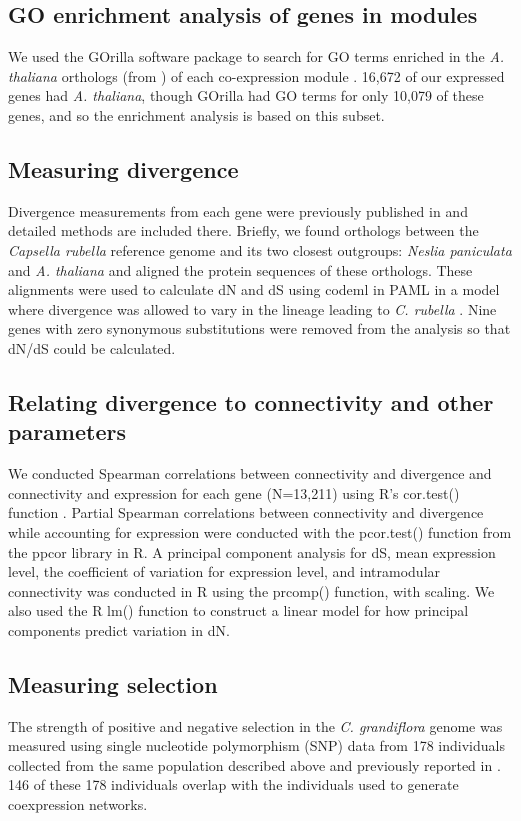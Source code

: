 \subsection{GO enrichment analysis of genes in modules}
We used the GOrilla software package to search for GO terms enriched in the \textit{A. thaliana} orthologs (from \citep{Williamson2014-tf}) of each co-expression module \citep{Eden2009-hl}. 16,672 of our expressed genes had \textit{A. thaliana}, though GOrilla had GO terms for only 10,079 of these genes, and so the enrichment analysis is based on this subset.

\subsection{Measuring divergence}
Divergence measurements from each gene were previously published in \citep{Williamson2014-tf} and detailed methods are included there. Briefly, we found orthologs between the \textit{Capsella rubella} reference genome and its two closest outgroups: \textit{Neslia paniculata} and \textit{A. thaliana} and aligned the protein sequences of these orthologs. These alignments were used to calculate dN and dS using codeml in PAML in a model where divergence was allowed to vary in the lineage leading to \textit{C. rubella} \citep{Yang2007-rs}. Nine genes with zero synonymous substitutions were removed from the analysis so that dN/dS could be calculated.

\subsection{Relating divergence to connectivity and other parameters}
We conducted Spearman correlations between connectivity and divergence and connectivity and expression for each gene (N=13,211) using R’s cor.test() function \citep{r}. Partial Spearman correlations between connectivity and divergence while accounting for expression were conducted with the pcor.test() function from the ppcor library in R. A principal component analysis for dS, mean expression level, the coefficient of variation for expression level, and intramodular connectivity was conducted in R using the prcomp() function, with scaling. We also used the R lm() function to construct a linear model for how principal components predict variation in dN.

\subsection{Measuring selection}
The strength of positive and negative selection in the \textit{C. grandiflora} genome was measured using single nucleotide polymorphism (SNP) data from 178 individuals collected from the same population described above and previously reported in \citep{Josephs2015-nx,Sicard2015-uc}. 146 of these 178 individuals overlap with the individuals used to generate coexpression networks.

